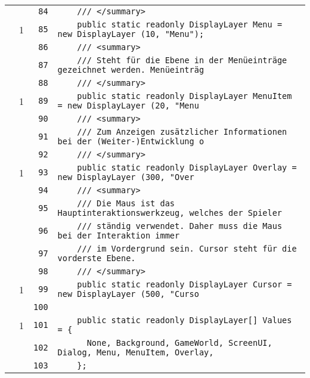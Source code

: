\documentclass[a4paper,10pt]{article}
\begin{document}
\begin{longtable}[l]{lrrl}
\cellcolor{gray} &  & \verb~84~ & \verb~    /// </summary>~\\
\cellcolor{green} & 1 & \verb~85~ & \verb~    public static readonly DisplayLayer Menu = new DisplayLayer (10, "Menu");~\\
\cellcolor{gray} &  & \verb~86~ & \verb~    /// <summary>~\\
\cellcolor{gray} &  & \verb~87~ & \verb~    /// Steht für die Ebene in der Menüeinträge gezeichnet werden. Menüeinträg~\\
\cellcolor{gray} &  & \verb~88~ & \verb~    /// </summary>~\\
\cellcolor{green} & 1 & \verb~89~ & \verb~    public static readonly DisplayLayer MenuItem = new DisplayLayer (20, "Menu~\\
\cellcolor{gray} &  & \verb~90~ & \verb~    /// <summary>~\\
\cellcolor{gray} &  & \verb~91~ & \verb~    /// Zum Anzeigen zusätzlicher Informationen bei der (Weiter-)Entwicklung o~\\
\cellcolor{gray} &  & \verb~92~ & \verb~    /// </summary>~\\
\cellcolor{green} & 1 & \verb~93~ & \verb~    public static readonly DisplayLayer Overlay = new DisplayLayer (300, "Over~\\
\cellcolor{gray} &  & \verb~94~ & \verb~    /// <summary>~\\
\cellcolor{gray} &  & \verb~95~ & \verb~    /// Die Maus ist das Hauptinteraktionswerkzeug, welches der Spieler~\\
\cellcolor{gray} &  & \verb~96~ & \verb~    /// ständig verwendet. Daher muss die Maus bei der Interaktion immer~\\
\cellcolor{gray} &  & \verb~97~ & \verb~    /// im Vordergrund sein. Cursor steht für die vorderste Ebene.~\\
\cellcolor{gray} &  & \verb~98~ & \verb~    /// </summary>~\\
\cellcolor{green} & 1 & \verb~99~ & \verb~    public static readonly DisplayLayer Cursor = new DisplayLayer (500, "Curso~\\
\cellcolor{gray} &  & \verb~100~ & \verb~~\\
\cellcolor{green} & 1 & \verb~101~ & \verb~    public static readonly DisplayLayer[] Values = {~\\
\cellcolor{gray} &  & \verb~102~ & \verb~      None, Background, GameWorld, ScreenUI, Dialog, Menu, MenuItem, Overlay, ~\\
\cellcolor{gray} &  & \verb~103~ & \verb~    };~\\

\end{longtable}
\end{document}
